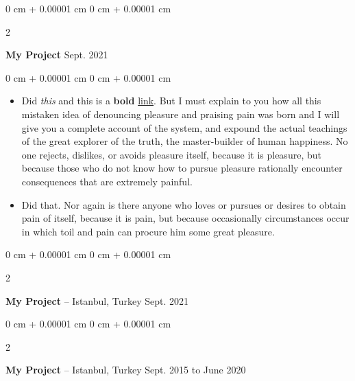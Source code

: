 \documentclass[10pt, letterpaper]{article}
\newenvironment{highlights}{
    \begin{itemize}[
        topsep=0.10 cm,
        parsep=0.10 cm,
        partopsep=0pt,
        itemsep=0pt,
        leftmargin=0 cm + 10pt
    ]
}{
    \end{itemize}
} %
\newenvironment{onecolentry}{
    \begin{adjustwidth}{
        0 cm + 0.00001 cm
    }{
        0 cm + 0.00001 cm
    }
}{
    \end{adjustwidth}
} %
\newenvironment{twocolentry}[2][]{
    \onecolentry
    \def\secondColumn{#2}
    \setcolumnwidth{\fill, 4.5 cm}
    \begin{paracol}{2}
}{
    \switchcolumn \raggedleft \secondColumn
    \end{paracol}
    \endonecolentry
} %
\begin{document}
        \vspace{0.2 cm}

        \begin{twocolentry}{
            Sept. 2021
        }
            \textbf{My Project}\end{twocolentry}

        \vspace{0.10 cm}
        \begin{onecolentry}
            \begin{highlights}
                \item Did \textit{this} and this is a \textbf{bold} \href{https://example.com}{link}. But I must explain to you how all this mistaken idea of denouncing pleasure and praising pain was born and I will give you a complete account of the system, and expound the actual teachings of the great explorer of the truth, the master-builder of human happiness. No one rejects, dislikes, or avoids pleasure itself, because it is pleasure, but because those who do not know how to pursue pleasure rationally encounter consequences that are extremely painful.
                \item Did that. Nor again is there anyone who loves or pursues or desires to obtain pain of itself, because it is pain, but because occasionally circumstances occur in which toil and pain can procure him some great pleasure.
            \end{highlights}
        \end{onecolentry}


        \vspace{0.2 cm}

        \begin{twocolentry}{
            Sept. 2021
        }
            \textbf{My Project} -- Istanbul, Turkey\end{twocolentry}



        \vspace{0.2 cm}

        \begin{twocolentry}{
            Sept. 2015 to June 2020
        }
            \textbf{My Project} -- Istanbul, Turkey\end{twocolentry}
\end{document}
